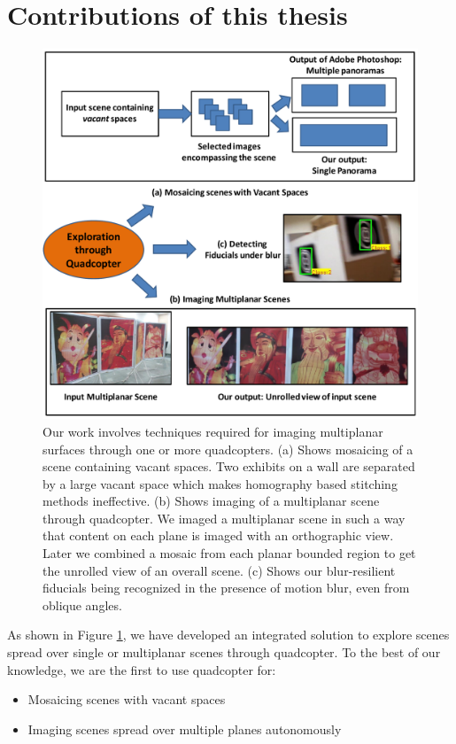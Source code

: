 \section{Contributions of this thesis}
\begin{figure}[h!]
\centering
\includegraphics[width=0.98\linewidth]{figures/contributions2}
\caption[Contributions]{Our work involves techniques required for imaging
multiplanar surfaces through one or more quadcopters. (a) Shows mosaicing of a scene containing
vacant spaces. Two exhibits on a wall are separated by  a large vacant space
which makes homography based stitching methods ineffective. (b) Shows imaging
of a multiplanar scene through quadcopter. We imaged a multiplanar scene in such
a way that content on each plane is imaged with an orthographic view. Later we
combined a mosaic from each planar bounded region to get the  unrolled view of
an overall scene. (c) Shows our blur-resilient fiducials being recognized in the
presence of motion blur, even from oblique angles.}
\label{fig:contributions}
\end{figure}

As shown in Figure \ref{fig:contributions}, we have developed an integrated solution to
explore scenes spread over single or multiplanar scenes through quadcopter. To
the best of our knowledge, we are the first to use quadcopter for:
\begin{itemize}
  \item Mosaicing scenes with vacant spaces  
  \item Imaging scenes spread over multiple planes autonomously   
\end{itemize}

